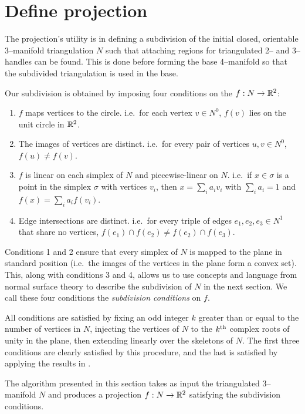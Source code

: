 \section{Define projection}
\label{section:pl-projection}

The projection's utility is in defining a subdivision of the initial closed, orientable 3--manifold triangulation $N$ such that attaching regions for triangulated 2-- and 3--handles can be found.
This is done before forming the base 4--manifold so that the subdivided triangulation is used in the base.

Our subdivision is obtained by imposing four conditions on the $f:N\to\mathbb{R}^2$:
\begin{enumerate}
	\item $f$ maps vertices to the circle.  i.e.\ for each vertex $v\in N^0$, $f(v)$ lies on the unit circle in $\mathbb{R}^2$.
	
	\item The images of vertices are distinct.  i.e.\ for every pair of vertices $u,v\in N^0$, $f(u)\neq f(v)$.
	
	\item $f$ is linear on each simplex of $N$ and piecewise-linear on $N$.  i.e.\ if $x\in\sigma$ is a point in the simplex $\sigma$ with vertices $v_i$, then $x=\sum_i a_i v_i$ with $\sum_i a_i = 1$ and $f(x) = \sum_i a_i f(v_i)$.
	
	\item Edge intersections are distinct. i.e.\ for every triple of edges $e_1, e_2, e_3\in N^1$ that share no vertices, $f(e_1)\cap f(e_2)\neq f(e_2)\cap f(e_3)$.
\end{enumerate}

Conditions 1 and 2 ensure that every simplex of $N$ is mapped to the plane in standard position (i.e.\ the images of the vertices in the plane form a convex set).
This, along with conditions 3 and 4, allows us to use concepts and language from normal surface theory to describe the subdivision of $N$ in the next section.
We call these four conditions the \emph{subdivision conditions} on $f$.

All conditions are satisfied by fixing an odd integer $k$ greater than or equal to the number of vertices in $N$, injecting the vertices of $N$ to the $k^{\text{th}}$ complex roots of unity in the plane, then extending linearly over the skeletons of $N$.
The first three conditions are clearly satisfied by this procedure, and the last is satisfied by applying the results in \cite{PoonRub98}.

The algorithm presented in this section takes as input the triangulated 3--manifold $N$ and produces a projection $f:N\to\mathbb{R}^2$ satisfying the subdivision conditions.